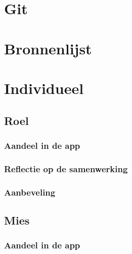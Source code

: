 \documentclass[dutch]{report}
\begin{document}
	\section{Git}
	
	\section{Bronnenlijst}
	
	\newpage
	\section{Individueel}
	
	\subsection{Roel}

	\subsubsection{Aandeel in de app}
	\subsubsection{Reflectie op de samenwerking}
	\subsubsection{Aanbeveling}
	
	\subsection{Mies}

	\subsubsection{Aandeel in de app}
\end{document}
